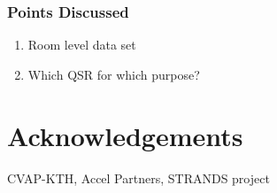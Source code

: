 \documentclass[letterpaper, 10 pt, conference]{ieeeconf}  %
\begin{document}
\subsubsection*{Points Discussed}
\begin{enumerate}
	\item Room level data set
	\item Which QSR for which purpose?
\end{enumerate}

\section{Acknowledgements}
\label{sec:Acknowledgements}
CVAP-KTH, Accel Partners, STRANDS project



\end{document}

